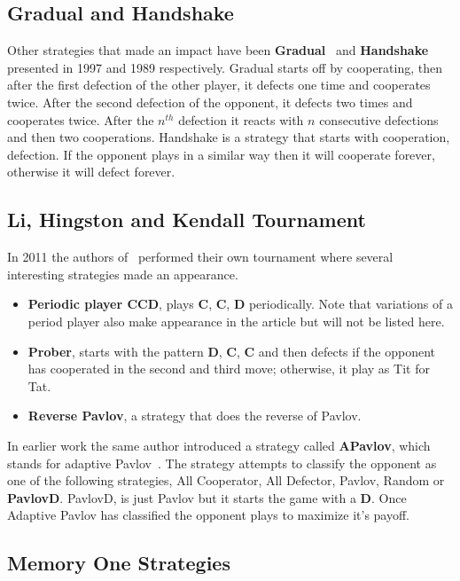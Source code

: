 \documentclass{article}
\begin{document}
\subsection{Gradual and Handshake}
Other strategies that made an impact have been \textbf{Gradual}~\cite{Beaufils1997}
and \textbf{Handshake}~\cite{Robson1989} presented in 1997 and 1989 respectively.
Gradual starts off by cooperating, then after the first defection of the other player, 
it defects one time and cooperates twice. After the second defection of the opponent,
it defects two times and cooperates twice. After the \(n^{th}\) defection it reacts with 
\(n\) consecutive defections and then two cooperations. 
Handshake is a strategy that starts with cooperation, defection. If the opponent plays in
a similar way then it will cooperate forever, otherwise it will defect forever.

\subsection{Li, Hingston and Kendall Tournament}
In 2011 the authors of~\cite{Li2011} performed their own tournament where 
several interesting strategies made an appearance. 

\begin{itemize}
    \item \textbf{Periodic player CCD}, plays \textbf{C}, \textbf{C}, \textbf{D} 
    periodically. Note that variations of a period player also make appearance
    in the article but will not be listed here.
    \item \textbf{Prober}, starts with the pattern \textbf{D}, \textbf{C}, \textbf{C}
     and then defects if the opponent has cooperated in the second and third move;
     otherwise, it play as Tit for Tat.
    \item \textbf{Reverse Pavlov}, a strategy that does the reverse of Pavlov.
\end{itemize}

In earlier work the same author introduced a strategy called \textbf{APavlov},
which stands for adaptive Pavlov~\cite{Li2007}. The strategy attempts to 
classify the opponent as one of the following strategies, All Cooperator, 
All Defector, Pavlov, Random or \textbf{PavlovD}. PavlovD, is just Pavlov
but it starts the game with a \textbf{D}. Once Adaptive Pavlov has classified
the opponent plays to maximize it's payoff.

\subsection{Memory One Strategies}
\end{document}
